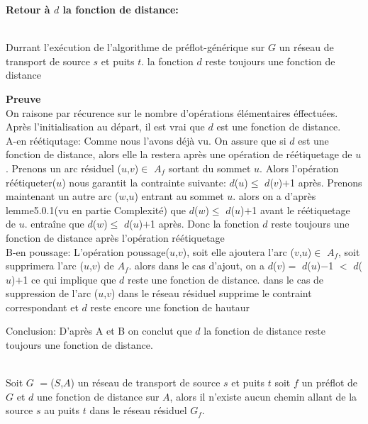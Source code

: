 \textbf{Retour à $d$ la fonction de distance:}\\
\begin{lemma} ~\\
	\label{residual_path}Durrant l'exécution de l'algorithme de préflot-générique sur $G$ un réseau de transport de source $s$ et puits $t$. la fonction $d$ reste toujours une fonction de distance
\end{lemma}  
\textbf{Preuve} \\
  On raisone par récurence sur le nombre d'opérations élémentaires éffectuées.
  Après l'initialisation au départ, il est vrai que $d$ est une fonction de distance.\\
  
  A-en réétiqutage:
  Comme nous l'avons déjà vu.
  On assure que si $d$ est une fonction de distance, alors elle la restera après une opération de réétiquetage de $u$.
  Prenons un arc résiduel ($u$,$v$)$\in$ $A_f$  sortant du sommet $u$.
  Alors l'opération réétiqueter($u$) nous garantit la contrainte suivante:
  $d$($u$)$\leq$ $d$($v$)$+$1 après.
  Prenons maintenant un autre arc ($w$,$u$) entrant au sommet $u$. alors on a d'après lemme5.0.1(vu en partie Complexité) que $d$($w$)$\leq$ $d$($u$)$+$1 avant le réétiquetage de $u$. entraîne que $d$($w$)$\leq$ $d$($u$)$+$1 après. Donc la fonction $d$ reste toujours une fonction de distance après l'opération réétiquetage\\
  
  B-en poussage:
  L'opération poussage($u$,$v$), soit elle ajoutera l'arc ($v$,$u$)$\in$ $A_f$, soit supprimera l'arc ($u$,$v$) de $A_f$. alors dans le cas d'ajout, on a $d$($v$)$=$ $d$($u$)$-$1 $<$ $d$($u$)$+$1 ce qui implique que $d$ reste une fonction de distance. dans le cas de suppression de l'arc ($u$,$v$) dans le réseau résiduel supprime le contraint correspondant et $d$ reste encore une fonction de hautaur 
 
 Conclusion:
  D'après A et B on conclut que $d$ la fonction de distance reste toujours une fonction de distance.
  \\
   
\begin{lemma} ~\\
	\label{borne_reetiq}Soit $G$ $=$($S$,$A$) un réseau de transport de source $s$ et puits $t$ soit $f$ un préflot de $G$ et $d$ une fonction de distance sur $A$, alors il n'existe aucun chemin allant de la source $s$ au puits $t$ dans le réseau résiduel $G_f$.
\end{lemma} 

